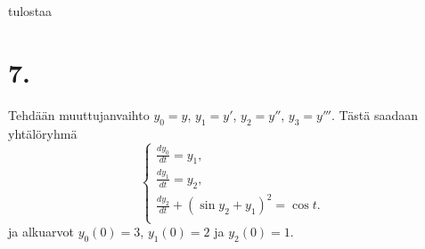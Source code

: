\documentclass{article}
\begin{document}
tulostaa




\section*{7.}

Tehdään muuttujanvaihto $y_0 = y$, $y_1 = y'$, $y_2 = y''$, $y_3 = y'''$.
Tästä saadaan yhtälöryhmä
\[
  \begin{cases}
    \frac{dy_0}{dt} = y_1, \\
    \frac{dy_1}{dt} = y_2, \\
    \frac{dy_2}{dt} + (\sin y_2 + y_1)^2 = \cos t. \\
  \end{cases}
\]
ja alkuarvot $y_0(0) = 3$, $y_1(0) = 2$ ja $y_2(0) = 1$.
\end{document}
